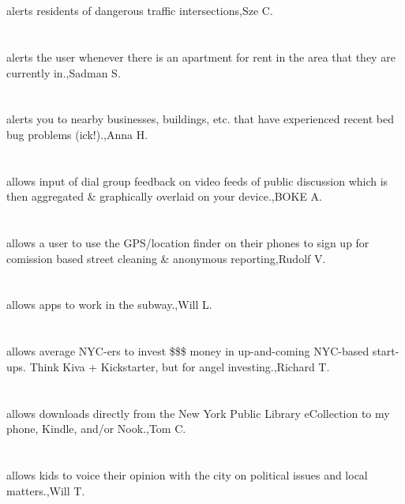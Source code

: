 \section{}alerts residents of dangerous traffic intersections,Sze C.
\section{} alerts the user whenever there is an apartment for rent in the area that they are currently in.,Sadman S.
\section{}  alerts you to nearby businesses, buildings, etc. that have experienced recent bed bug problems (ick!).,Anna H.
\section{}allows  input of  dial group feedback on video feeds of public discussion which is then aggregated \& graphically overlaid  on your device.,BOKE A.
\section{}allows a user to use the GPS/location finder on their phones to sign up for comission based street cleaning \& anonymous reporting,Rudolf V.
\section{}allows apps to work in the subway.,Will L.
\section{}allows average NYC-ers to invest \$\$\$ money in up-and-coming NYC-based start-ups. Think Kiva + Kickstarter, but for angel investing.,Richard T.
\section{}allows downloads directly from the New York Public Library eCollection to my phone, Kindle, and/or Nook.,Tom C.	
\section{} allows kids to voice their opinion with the city on political issues and local matters.,Will T.	
